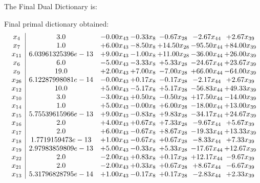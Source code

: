 \documentclass[8pt]{article}
\begin{document}
The Final Dual Dictionary is: 

 Final primal dictionary obtained: 
\[\begin{array}{c| c c@{\hskip 2pt} c@{\hskip 2pt} c@{\hskip 2pt} c@{\hskip 2pt} c@{\hskip 2pt} }
 x_{4}   &  3.0 & -0.00 x_{43} & -0.33 x_{8} & -0.67 x_{28} & -2.67 x_{44} & +  2.67 x_{39}\\
 x_{7}   &  1.0 & +  6.00 x_{43} & -8.50 x_{8} & + 14.50 x_{28} & -95.50 x_{44} & + 84.00 x_{39}\\
 x_{11}   &  6.03961325396e-13 & +  9.00 x_{43} & -1.00 x_{8} & + 11.00 x_{28} & -36.00 x_{44} & + 26.00 x_{39}\\
 x_{6}   &  6.0 & -5.00 x_{43} & -3.33 x_{8} & +  5.33 x_{28} & -24.67 x_{44} & + 23.67 x_{39}\\
 x_{9}   &  19.0 & +  2.00 x_{43} & +  7.00 x_{8} & -7.00 x_{28} & + 66.00 x_{44} & -64.00 x_{39}\\
 x_{26}   &  6.12287998081e-14 & -0.00 x_{43} & +  0.17 x_{8} & -0.17 x_{28} & -2.17 x_{44} & +  2.67 x_{39}\\
 x_{12}   &  10.0 & +  5.00 x_{43} & -5.17 x_{8} & +  5.17 x_{28} & -56.83 x_{44} & + 49.33 x_{39}\\
 x_{10}   &  3.0 & -3.00 x_{43} & +  0.50 x_{8} & -0.50 x_{28} & + 17.50 x_{44} & -14.00 x_{39}\\
 x_{14}   &  1.0 & +  5.00 x_{43} & -0.00 x_{8} & +  6.00 x_{28} & -18.00 x_{44} & + 13.00 x_{39}\\
 x_{15}   &  5.75539615966e-13 & +  9.00 x_{43} & -0.83 x_{8} & +  9.83 x_{28} & -34.17 x_{44} & + 24.67 x_{39}\\
 x_{16}   &  2.0 & +  4.00 x_{43} & +  0.67 x_{8} & +  7.33 x_{28} & -9.67 x_{44} & +  5.67 x_{39}\\
 x_{17}   &  2.0 & +  6.00 x_{43} & -0.67 x_{8} & +  8.67 x_{28} & -19.33 x_{44} & + 13.33 x_{39}\\
 x_{18}   &  1.7719159473e-13 & +  1.00 x_{43} & -0.67 x_{8} & +  0.67 x_{28} & -8.33 x_{44} & +  7.33 x_{39}\\
 x_{19}   &  2.97983859809e-13 & +  5.00 x_{43} & -0.33 x_{8} & +  5.33 x_{28} & -17.67 x_{44} & + 12.67 x_{39}\\
 x_{22}   &  2.0 & -2.00 x_{43} & +  0.83 x_{8} & +  0.17 x_{28} & + 12.17 x_{44} & -9.67 x_{39}\\
 x_{21}   &  2.0 & -2.00 x_{43} & +  0.33 x_{8} & +  0.67 x_{28} & +  8.67 x_{44} & -6.67 x_{39}\\
 x_{13}   &  5.31796828795e-14 & +  1.00 x_{43} & -0.17 x_{8} & +  0.17 x_{28} & -2.83 x_{44} & +  2.33 x_{39}\\

\end{array}\]
\end{document}
